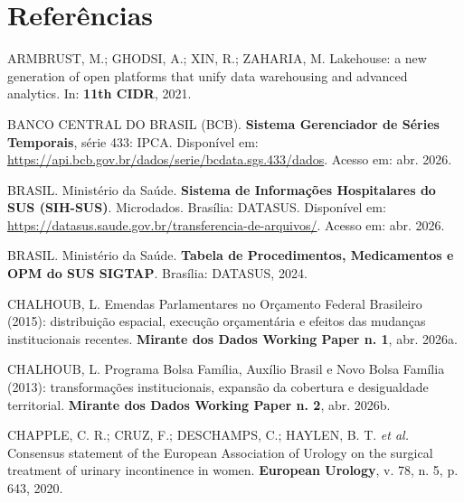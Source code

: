 \documentclass[12pt,a4paper,oneside]{article}
\begin{document}
\section*{Referências}\label{sec:ref}
\begin{singlespace}\small
\noindent\hangindent=1.25cm
ARMBRUST, M.; GHODSI, A.; XIN, R.; ZAHARIA, M. Lakehouse: a new
generation of open platforms that unify data warehousing and
advanced analytics. In: \textbf{11th CIDR}, 2021.\par\smallskip

\noindent\hangindent=1.25cm
BANCO CENTRAL DO BRASIL (BCB). \textbf{Sistema Gerenciador de
Séries Temporais}, série 433: IPCA. Disponível em:
\url{https://api.bcb.gov.br/dados/serie/bcdata.sgs.433/dados}.
Acesso em: abr. 2026.\par\smallskip

\noindent\hangindent=1.25cm
BRASIL. Ministério da Saúde. \textbf{Sistema de Informações
Hospitalares do SUS (SIH-SUS)}. Microdados. Brasília: DATASUS.
Disponível em:
\url{https://datasus.saude.gov.br/transferencia-de-arquivos/}.
Acesso em: abr. 2026.\par\smallskip

\noindent\hangindent=1.25cm
BRASIL. Ministério da Saúde. \textbf{Tabela de Procedimentos,
Medicamentos e OPM do SUS \textemdash{} SIGTAP}. Brasília:
DATASUS, 2024.\par\smallskip

\noindent\hangindent=1.25cm
CHALHOUB, L. Emendas Parlamentares no Orçamento Federal
Brasileiro (2015): distribuição espacial,
execução orçamentária e efeitos das mudanças institucionais
recentes. \textbf{Mirante dos Dados \textemdash{} Working Paper
n. 1}, abr. 2026a.\par\smallskip

\noindent\hangindent=1.25cm
CHALHOUB, L. Programa Bolsa Família, Auxílio Brasil e Novo
Bolsa Família (2013): transformações
institucionais, expansão da cobertura e desigualdade territorial.
\textbf{Mirante dos Dados \textemdash{} Working Paper n. 2},
abr. 2026b.\par\smallskip

\noindent\hangindent=1.25cm
CHAPPLE, C. R.; CRUZ, F.; DESCHAMPS, C.; HAYLEN, B. T.
\textit{et al.} Consensus statement of the European Association
of Urology on the surgical treatment of urinary incontinence in
women. \textbf{European Urology}, v. 78, n. 5,
p. 643, 2020.\par\smallskip


\end{singlespace}
\end{document}
